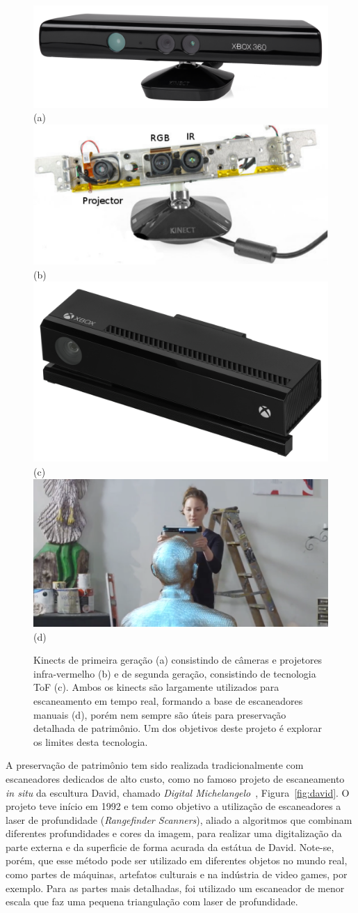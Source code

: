 \begin{figure} [!h]
	\centering
	\includegraphics[width=0.45\linewidth]{figs/Xbox-360-Kinect-Standalone.png}(a)
	\includegraphics[width=0.45\linewidth]{figs/kinect-internals.pdf}(b)
 	\includegraphics[width=0.45\linewidth]{figs/Xbox-One-Kinect.jpg}(c)
 	\includegraphics[width=0.45\linewidth]{figs/kinect-handheld1.png} (d)
	\caption{%
   Kinects de primeira geração (a) consistindo de câmeras e projetores
   infra-vermelho (b) e de segunda geração, consistindo de tecnologia ToF (c). 
   Ambos os kinects são largamente utilizados para escaneamento em tempo real, 
   formando a base de escaneadores manuais (d), porém nem sempre são úteis para 
   preservação detalhada de patrimônio. Um dos objetivos deste
   projeto é explorar os limites desta tecnologia.
	}\label{fig:kinect}
\end{figure}

A preservação de patrimônio tem sido realizada tradicionalmente com escaneadores
dedicados de alto custo, como no famoso projeto de escaneamento \emph{in situ} da escultura
David, chamado \emph{Digital Michelangelo}~\cite{levoy2000digital},
Figura~\ref{fig:david}.  O projeto teve início em 1992 e tem como objetivo a
utilização de escaneadores a laser de profundidade (\emph{Rangefinder Scanners}),
aliado a algoritmos que combinam diferentes profundidades e cores da imagem,
para realizar uma digitalização da parte externa e da superficie de forma
acurada da estátua de David. Note-se, porém, que esse método pode ser utilizado em diferentes
objetos no mundo real, como partes de máquinas, artefatos culturais e na
indústria de video games, por exemplo.  Para as partes mais detalhadas, foi
utilizado um escaneador de menor escala que faz uma pequena triangulação com
laser de profundidade.

